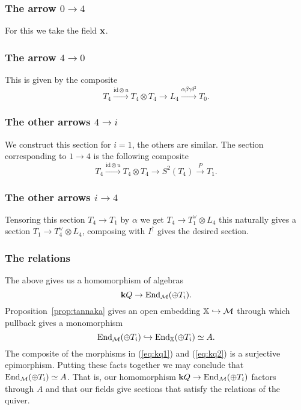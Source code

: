 \documentclass{amsart}
\theoremstyle{definition}
\begin{document}
\subsubsection{The arrow $0 \rightarrow 4$}

For this we take the field $\mathbf{x}$.

\subsubsection{The arrow $4 \rightarrow 0$}
This is given by the composite
$$T_4 \xrightarrow{\text{id}\otimes u} T_4 \otimes T_4 \rightarrow L_4 \xrightarrow{\alpha\beta\gamma\delta^2} T_0.$$

\subsubsection{The other arrows $4 \rightarrow i$}
We construct this section for $i=1$, the others are similar.
The section corresponding to $1 \rightarrow 4$ is the following composite $$T_4 \xrightarrow{\text{id}\otimes u} T_4 \otimes T_4 \rightarrow S^2(T_4) \xrightarrow{P} T_1.$$

\subsubsection{The other arrows $i \rightarrow 4$}
Tensoring this section $T_4 \rightarrow T_1$ by $\alpha$ we get $T_4 \rightarrow T_1^\vee \otimes L_4$ this naturally gives a section $T_1 \rightarrow T_4^\vee \otimes L_4$, composing with $I^\dagger$ gives the desired section.

\subsubsection{The relations}

The above gives us a homomorphism of algebras \begin{equation} \label{eq:kq1}
    \mathbf{k} Q \rightarrow \operatorname{End}_{\mathcal{M}}(\oplus T_i).
\end{equation}
Proposition~\ref{prop:tannaka} gives an open embedding $\mathbb{X} \hookrightarrow \mathcal{M}$ through which pullback gives a monomorphism \begin{equation}\label{eq:kq2}
    \operatorname{End}_{\mathcal{M}}(\oplus T_i) \hookrightarrow \operatorname{End}_{\mathbb{X}}(\oplus T_i) \simeq A.
\end{equation}
The composite of the morphisms in (\ref{eq:kq1}) and (\ref{eq:kq2}) is a surjective epimorphism.
Putting these facts together we may conclude that $\operatorname{End}_{\mathcal{M}}(\oplus T_i) \simeq A$.
That is, our homomorphism $\mathbf{k} Q \rightarrow \operatorname{End}_{\mathcal{M}}(\oplus T_i)$ factors through $A$ and that our fields give sections that satisfy the relations of the quiver.
\end{document}
